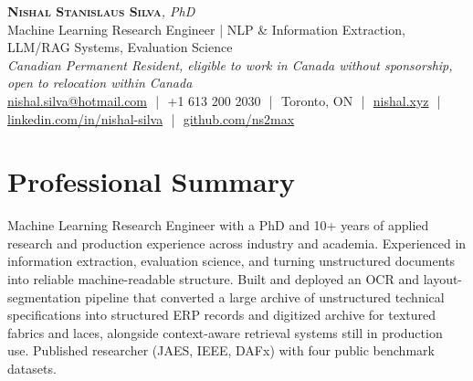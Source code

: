\documentclass[11pt]{article}
\begin{document}
\pagestyle{empty}

\begin{center}
    {\LARGE \scshape \textbf{Nishal Stanislaus Silva}}{\large \textit {, PhD}}
    \\[1pt]
    {\small Machine Learning Research Engineer | NLP \& Information Extraction, LLM/RAG Systems, Evaluation Science}
    \\[1pt]
    {\footnotesize\textit{Canadian Permanent Resident, eligible to work in Canada without sponsorship, open to relocation within Canada}}
    \\[1pt]
    {\small
    \href{mailto:nishal.silva@hotmail.com}{nishal.silva@hotmail.com}
    \,\,|\,\, +1 613 200 2030
    \,\,|\,\, Toronto, ON
    \,\,|\,\, \href{https://nishal.xyz}{nishal.xyz}
    \,\,|\,\, \href{https://www.linkedin.com/in/nishal-silva}{linkedin.com/in/nishal-silva}
    \,\,|\,\, \href{https://github.com/ns2max}{github.com/ns2max}}
\end{center}

\section*{Professional Summary}


Machine Learning Research Engineer with a PhD and 10+ years of applied research and production experience across industry and academia. Experienced in information extraction, evaluation science, and turning unstructured documents into reliable machine-readable structure. Built and deployed an OCR and layout-segmentation pipeline that converted a large archive of unstructured technical specifications into structured ERP records and digitized archive for textured fabrics and laces, alongside context-aware retrieval systems still in production use. Published researcher (JAES, IEEE, DAFx) with four public benchmark datasets.
\end{document}
